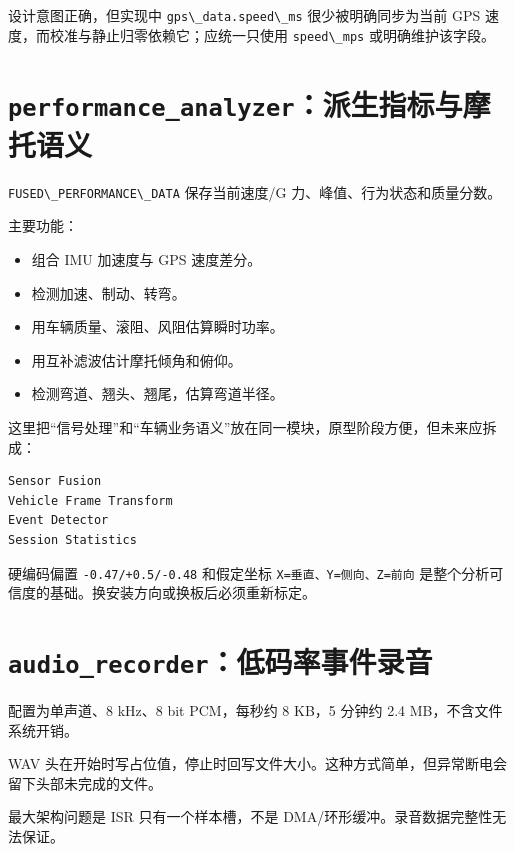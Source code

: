 \documentclass[
  UTF8,11pt,a4paper]{ctexart}
\newcommand{\passthrough}[1]{#1}
\providecommand{\tightlist}{%
  \setlength{\itemsep}{0pt}\setlength{\parskip}{0pt}}
\begin{document}
设计意图正确，但实现中 \passthrough{\lstinline!gps\_data.speed\_ms!}
很少被明确同步为当前 GPS 速度，而校准与静止归零依赖它；应统一只使用
\passthrough{\lstinline!speed\_mps!} 或明确维护该字段。

\section{\texorpdfstring{\texttt{performance\_analyzer}：派生指标与摩托语义}{performance\_analyzer：派生指标与摩托语义}}\label{performance_analyzerux6d3eux751fux6307ux6807ux4e0eux6469ux6258ux8bedux4e49}

\passthrough{\lstinline!FUSED\_PERFORMANCE\_DATA!} 保存当前速度/G
力、峰值、行为状态和质量分数。

主要功能：

\begin{itemize}
\tightlist
\item
  组合 IMU 加速度与 GPS 速度差分。
\item
  检测加速、制动、转弯。
\item
  用车辆质量、滚阻、风阻估算瞬时功率。
\item
  用互补滤波估计摩托倾角和俯仰。
\item
  检测弯道、翘头、翘尾，估算弯道半径。
\end{itemize}

这里把``信号处理''和``车辆业务语义''放在同一模块，原型阶段方便，但未来应拆成：

\begin{lstlisting}
Sensor Fusion
Vehicle Frame Transform
Event Detector
Session Statistics
\end{lstlisting}

硬编码偏置 \passthrough{\lstinline!-0.47/+0.5/-0.48!} 和假定坐标
\passthrough{\lstinline!X=垂直、Y=侧向、Z=前向!}
是整个分析可信度的基础。换安装方向或换板后必须重新标定。

\section{\texorpdfstring{\texttt{audio\_recorder}：低码率事件录音}{audio\_recorder：低码率事件录音}}\label{audio_recorderux4f4eux7801ux7387ux4e8bux4ef6ux5f55ux97f3}

配置为单声道、8 kHz、8 bit PCM，每秒约 8 KB，5 分钟约 2.4
MB，不含文件系统开销。

WAV
头在开始时写占位值，停止时回写文件大小。这种方式简单，但异常断电会留下头部未完成的文件。

最大架构问题是 ISR 只有一个样本槽，不是
DMA/环形缓冲。录音数据完整性无法保证。
\end{document}
